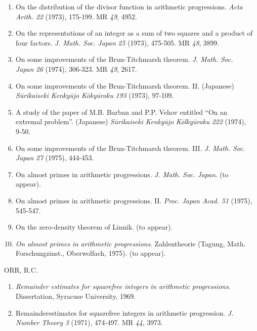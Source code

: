 \begin{thebibliography}{99}
\begin{enumerate}
\item On the distribution of the divisor function in arithmetic
  progressions. \textit{Acta Arith. 22} (1973), 175-199. MR
  {\em 49}, 4952. 

\item On the representations of an integer as a sum of two squares and
  a product of four factors. \textit{J. Math. Soc. Japan
  25} (1973), 475-505. MR {\em 48}, 3899. 

\item On some improvements of the Brun-Titchmarsh
  theorem. \textit{J. Math. Soc. Japan 26} (1974), 306-323. MR
  {\em 49}, 2617. 

\item On some improvements of the Brun-Titchmarsh theorem. II.
  (Japanese) \textit{S\=urikaiseki Kenky\=ujo K\=oky\=uroku 193} 
   (1973), 97-109. 

\item A study of the paper of M.B. Barban and P.P. Vehov entitled ``On
  an extremal problem''. (Japanese) \textit{S\=urikaiseki Kenky\=ujo
    K\=olky\=uroku 222} (1974), 9-50. 

\item On some improvements of the Brun-Titchmarsh
  theorem. III. \textit{J. Math. Soc. Japan 27} (1975), 444-453. 

\item On almost primes in arithmetic
  progressions. \textit{J. Math. Soc. Japan}. (to appear). 

\item On almost primes in arithmetic
  progressions. II. \textit{Proc. Japan Acad. 51} (1975), 545-547.
 
\item On the zero-density theorem of Linnik. (to appear).

\item \textit{On almost primes in arithmetic
  progressions}. Zahlentheorie (Tagung, Math. Forschungzinst.,
  Oberwolfach, 1975). (to appear). 
\end{enumerate}

 ORR, R.C.
\begin{enumerate}
\item \textit{Remainder estimates for squarefree integers in
  arithmetic progressions}. Dissertation, Syracuse University, 1969.

\item Remainder\pageoriginale estimates for squarefree integers in
  arithmetic progression. \textit{J. Number Theory 3} (1971), 474-497. MR
  {\em 44}, 3973.
\end{enumerate}


\end{thebibliography}
